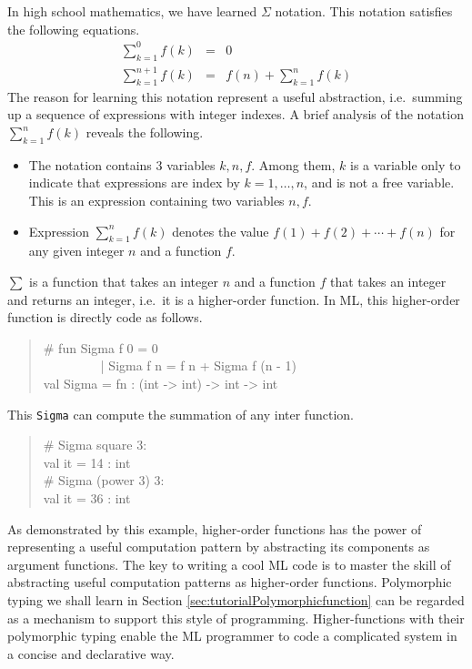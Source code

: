 \documentclass{jbook}
\newenvironment{program}{\begin{tt}\begin{quote}}{\end{quote}\end{tt}}
\begin{document}
	In high school mathematics, we have learned $\Sigma$ notation.
	This notation satisfies the following equations.
\begin{eqnarray*}
\sum_{k=1}^0 f(k) &=& 0\\
\sum_{k=1}^{n+1} f(k) &=& f(n) + \sum_{k=1}^{n} f(k)
\end{eqnarray*}
	The reason for learning this notation represent a useful
abstraction, i.e.\ summing up a sequence of expressions with integer
indexes.
	A brief analysis of the notation $\sum_{k=1}^n f(k)$ reveals the
following.
\begin{itemize}
\item The notation contains 3 variables $k,n,f$.
	Among them, $k$ is a variable only to indicate that
expressions are index by $k=1,\ldots,n$, and is not a free variable. 
	This is an expression containing two variables $n,f$.
\item Expression $\sum_{k=1}^n f(k)$ denotes the value
$
f(1) + f(2) + \cdots + f(n)
$
for any given integer $n$ and a function $f$.
\end{itemize}
	$\sum$ is a function that takes an integer $n$ and a function
$f$ that takes an integer and returns an integer, i.e.\ it is a
higher-order function.
	In ML, this higher-order function is directly code as follows.
\begin{program}
\# fun Sigma f 0 = 0\\
\ \ \ \ \ \ \ \ \  | Sigma f n = f n + Sigma f (n - 1)\\
val Sigma = fn : (int -> int) -> int -> int
\end{program}
	This {\tt Sigma} can compute the summation of any inter function.
\begin{program}
\# Sigma square 3:\\
val it = 14 : int\\
\# Sigma (power 3) 3:\\
val it = 36 : int
\end{program}

	As demonstrated by this example, higher-order functions has the
power of representing a useful computation pattern by abstracting its
components as argument functions.
	The key to writing a cool ML code is to master the skill of
abstracting useful computation patterns as higher-order functions.
	Polymorphic typing we shall learn in Section
\ref{sec:tutorialPolymorphicfunction} can be regarded as a mechanism to
support this style of programming. 
	Higher-functions with their polymorphic typing enable the ML
programmer to code a complicated system in a concise and declarative
way.
\end{document}
